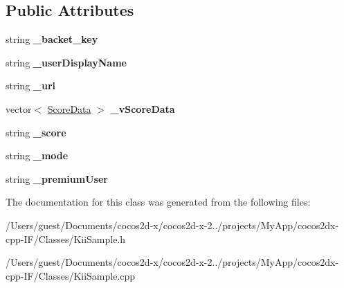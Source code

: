 \subsection*{Public Attributes}
\begin{DoxyCompactItemize}
\item 
\hypertarget{class_kii_sample_a8891048ee0ed22df034c5747eec40b0a}{string {\bfseries \-\_\-backet\-\_\-key}}\label{class_kii_sample_a8891048ee0ed22df034c5747eec40b0a}

\item 
\hypertarget{class_kii_sample_a772c70dabf4548cf7c12391866a8eb1a}{string {\bfseries \-\_\-user\-Display\-Name}}\label{class_kii_sample_a772c70dabf4548cf7c12391866a8eb1a}

\item 
\hypertarget{class_kii_sample_a4fb566297ec7b139f9568904711f530a}{string {\bfseries \-\_\-uri}}\label{class_kii_sample_a4fb566297ec7b139f9568904711f530a}

\item 
\hypertarget{class_kii_sample_a0807c98c833578888dd4b910fc37a4fd}{vector$<$ \hyperlink{class_score_data}{Score\-Data} $>$ {\bfseries \-\_\-v\-Score\-Data}}\label{class_kii_sample_a0807c98c833578888dd4b910fc37a4fd}

\item 
\hypertarget{class_kii_sample_a59d61a2c3d04a8e04e70b04af69cd6bd}{string {\bfseries \-\_\-score}}\label{class_kii_sample_a59d61a2c3d04a8e04e70b04af69cd6bd}

\item 
\hypertarget{class_kii_sample_ac89b63dda8b4059d7bf3c795b8917bf6}{string {\bfseries \-\_\-mode}}\label{class_kii_sample_ac89b63dda8b4059d7bf3c795b8917bf6}

\item 
\hypertarget{class_kii_sample_aea3e469c143d19e269e9e3e9750a194b}{string {\bfseries \-\_\-premium\-User}}\label{class_kii_sample_aea3e469c143d19e269e9e3e9750a194b}

\end{DoxyCompactItemize}


The documentation for this class was generated from the following files\-:\begin{DoxyCompactItemize}
\item 
/\-Users/guest/\-Documents/cocos2d-\/x/cocos2d-\/x-\/2../projects/\-My\-App/cocos2dx-\/cpp-\/\-I\-F/\-Classes/Kii\-Sample.\-h\item 
/\-Users/guest/\-Documents/cocos2d-\/x/cocos2d-\/x-\/2../projects/\-My\-App/cocos2dx-\/cpp-\/\-I\-F/\-Classes/Kii\-Sample.\-cpp\end{DoxyCompactItemize}
